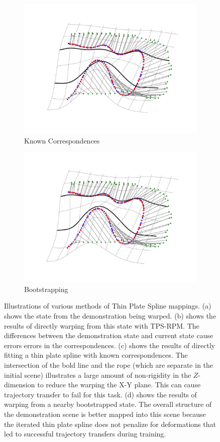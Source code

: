 \begin{figure}
\begin{subfigure}[b]{.48\linewidth}
    \includegraphics[width=\textwidth]{figs/warp_root_known.pdf}
    \caption{Known Correspondences}
    \label{fig:corresponds}
  \end{subfigure}
  \begin{subfigure}[b]{.48\linewidth}
    \includegraphics[width=\textwidth]{figs/warp_derived.pdf}
    \caption{Bootstrapping}
    \label{fig:bootstrap}
  \end{subfigure}
  \caption{Illustrations of various methods of Thin Plate Spline mappings.
  (a) shows the state from the demonstration being warped. (b) shows the results of directly warping from this state with TPS-RPM. The differences between the demonstration state and current state cause errors errors in the correspondences. (c) shows the results of directly fitting a thin plate spline with known correspondences. The intersection of the bold line and the rope (which are separate in the initial scene) illustrates a large amount of non-rigidity in the $Z$-dimension to reduce the warping the X-Y plane. This can cause trajectory transfer to fail for this task. (d) shows the results of warping from a nearby bootstrapped state. The overall structure of the demonstration scene is better mapped into this scene because the iterated thin plate spline does not penalize for deformations that led to successful trajectory transfers during training.}
  \label{fig:warps}
\end{figure}

